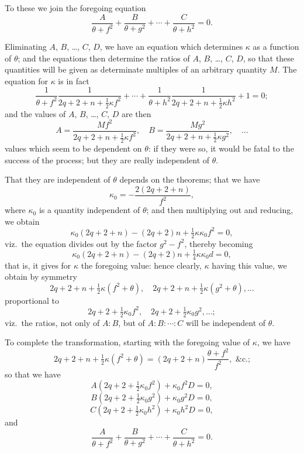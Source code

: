 \documentclass[11pt,a4paper]{book}
\begin{document}
\begin{art}\label{art:119}
To these we join the foregoing equation
\[
\frac{A}{\theta+f^2} + \frac{B}{\theta+g^2} + \cdots + \frac{C}{\theta+h^2} = 0.
\]

Eliminating $A$, $B$, \ldots, $C$, $D$, we have an equation which determines $\kappa$ as a function of $\theta$; and the equations then determine the ratios of $A$, $B$, \ldots, $C$, $D$, so that these quantities will be given as determinate multiples of an arbitrary quantity $M$. The equation for $\kappa$ is in fact
\[
\frac{1}{\theta+f^2}\frac{1}{2q+2+n+\tfrac{1}{2}\kappa f^2} + \cdots + \frac{1}{\theta+h^2}\frac{1}{2q+2+n+\tfrac{1}{2}\kappa h^2} + 1 = 0;
\]
and the values of $A$, $B$, \ldots, $C$, $D$ are then
\[
A = \frac{Mf^2}{2q+2+n+\tfrac{1}{2}\kappa f^2}, \quad B = \frac{Mg^2}{2q+2+n+\tfrac{1}{2}\kappa g^2}, \quad \ldots
\]
values which seem to be dependent on $\theta$: if they were so, it would be fatal to the success of the process; but they are really independent of $\theta$.
\end{art}

\begin{art}\label{art:120}
That they are independent of $\theta$ depends on the theorems; that we have
\[
\kappa_0 = -\frac{2(2q+2+n)}{f^2},
\]
where $\kappa_0$ is a quantity independent of $\theta$; and then multiplying out and reducing, we obtain
\[
\kappa_0(2q+2+n) - (2q+2)n + \tfrac{1}{2}\kappa\kappa_0 f^2 = 0,
\]
viz.\ the equation divides out by the factor $g^2 - f^2$, thereby becoming
\[
\kappa_0(2q+2+n) - (2q+2)n + \tfrac{1}{4}\kappa\kappa_0 d = 0,
\]
that is, it gives for $\kappa$ the foregoing value: hence clearly, $\kappa$ having this value, we obtain by symmetry
\[
2q+2+n+\tfrac{1}{2}\kappa(f^2+\theta), \quad 2q+2+n+\tfrac{1}{2}\kappa(g^2+\theta), \ldots
\]
proportional to
\[
2q+2+\tfrac{1}{2}\kappa_0 f^2, \quad 2q+2+\tfrac{1}{2}\kappa_0 g^2, \ldots;
\]
viz.\ the ratios, not only of $A:B$, but of $A:B:\cdots:C$ will be independent of $\theta$.
\end{art}

\begin{art}\label{art:121}
To complete the transformation, starting with the foregoing value of $\kappa$, we have
\[
2q+2+n+\tfrac{1}{2}\kappa(f^2+\theta) = (2q+2+n)\frac{\theta+f^2}{f^2}, \text{ \&c.;}
\]
so that we have
\[
A(2q+2+\tfrac{1}{2}\kappa_0 f^2) + \kappa_0 f^2 D = 0,
\]
\[
B(2q+2+\tfrac{1}{2}\kappa_0 g^2) + \kappa_0 g^2 D = 0,
\]
\[
C(2q+2+\tfrac{1}{2}\kappa_0 h^2) + \kappa_0 h^2 D = 0,
\]
and
\[
\frac{A}{\theta+f^2} + \frac{B}{\theta+g^2} + \cdots + \frac{C}{\theta+h^2} = 0.
\]
\end{art}
\end{document}
